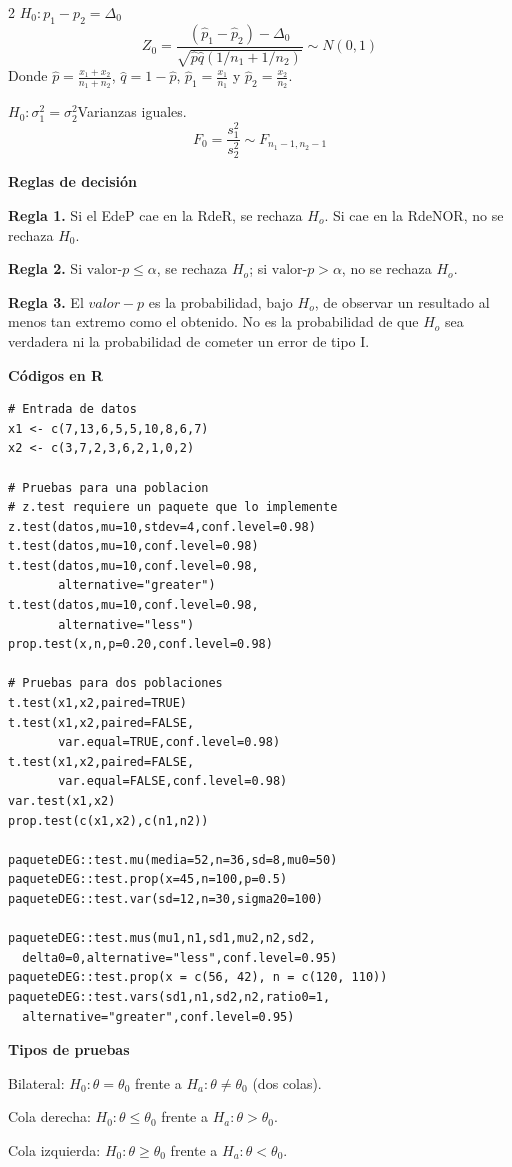 \documentclass[letterpaper,10pt]{article}
\begin{document}
\begin{multicols}{2}
\columnbreak
\textbf{$H_0:p_1-p_2=\Delta_0$}
\begin{equation}
Z_0=\frac{(\hat p_1-\hat p_2)-\Delta_0}{\sqrt{\hat p\hat q(1/n_1+1/n_2)}}\sim N(0,1)
\end{equation}
Donde $\hat p=\frac{x_1+x_2}{n_1+n_2}$, $\hat q=1-\hat p$, $\hat p_1=\frac{x_1}{n_1}$ y $\hat p_2=\frac{x_2}{n_2}$.

\textbf{$H_0:\sigma_1^2=\sigma_2^2$}\quad Varianzas iguales.
\begin{equation}
F_0=\frac{s_1^2}{s_2^2}\sim F_{n_1-1,n_2-1}
\end{equation}

\textbf{Reglas de decisión}

\textbf{Regla 1.} Si el EdeP cae en la RdeR, se rechaza $H_o$. Si cae en la RdeNOR, no se rechaza $H_0$.

\textbf{Regla 2.} Si $\text{valor-}p\leq\alpha$, se rechaza $H_o$; si $\text{valor-}p>\alpha$, no se rechaza $H_o$.

\textbf{Regla 3.} El $valor-p$ es la probabilidad, bajo $H_o$, de observar un resultado al menos tan extremo como el obtenido. No es la probabilidad de que $H_o$ sea verdadera ni la probabilidad de cometer un error de tipo I.

\textbf{Códigos en R}

\begin{lstlisting}
# Entrada de datos
x1 <- c(7,13,6,5,5,10,8,6,7)
x2 <- c(3,7,2,3,6,2,1,0,2)

# Pruebas para una poblacion
# z.test requiere un paquete que lo implemente
z.test(datos,mu=10,stdev=4,conf.level=0.98)
t.test(datos,mu=10,conf.level=0.98)
t.test(datos,mu=10,conf.level=0.98,
       alternative="greater")
t.test(datos,mu=10,conf.level=0.98,
       alternative="less")
prop.test(x,n,p=0.20,conf.level=0.98)

# Pruebas para dos poblaciones
t.test(x1,x2,paired=TRUE)
t.test(x1,x2,paired=FALSE,
       var.equal=TRUE,conf.level=0.98)
t.test(x1,x2,paired=FALSE,
       var.equal=FALSE,conf.level=0.98)
var.test(x1,x2)
prop.test(c(x1,x2),c(n1,n2))

paqueteDEG::test.mu(media=52,n=36,sd=8,mu0=50)
paqueteDEG::test.prop(x=45,n=100,p=0.5)
paqueteDEG::test.var(sd=12,n=30,sigma20=100)

paqueteDEG::test.mus(mu1,n1,sd1,mu2,n2,sd2,
  delta0=0,alternative="less",conf.level=0.95)
paqueteDEG::test.prop(x = c(56, 42), n = c(120, 110))                                        
paqueteDEG::test.vars(sd1,n1,sd2,n2,ratio0=1,
  alternative="greater",conf.level=0.95) 

\end{lstlisting}
\textbf{Tipos de pruebas}

Bilateral: $H_0:\theta=\theta_0$ frente a $H_a:\theta\ne\theta_0$ (dos colas).

Cola derecha: $H_0:\theta\leq\theta_0$ frente a $H_a:\theta>\theta_0$.

Cola izquierda: $H_0:\theta\geq\theta_0$ frente a $H_a:\theta<\theta_0$.
\end{multicols}
\end{document}
